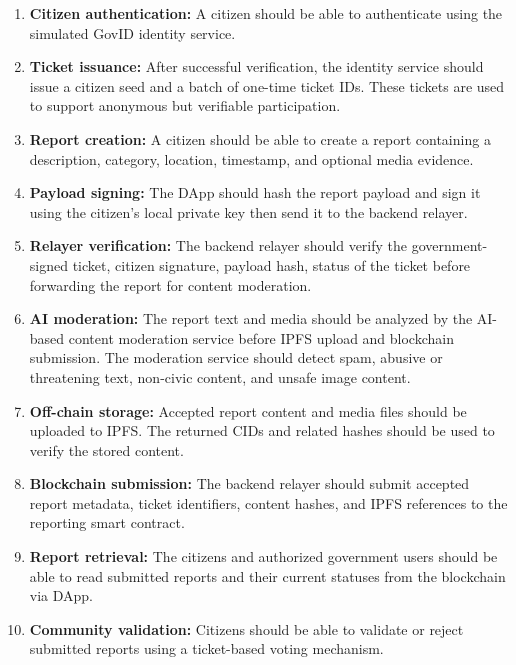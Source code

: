 \begin{enumerate}
    \item \textbf{Citizen authentication:}
    A citizen should be able to authenticate using the simulated GovID identity service.

    \item \textbf{Ticket issuance:}
    After successful verification, the identity service should issue a citizen seed and a 
    batch of one-time ticket IDs. These tickets are used to support anonymous but 
    verifiable participation.

    \item \textbf{Report creation:}
    A citizen should be able to create a report containing a description, category, 
    location, timestamp, and optional media evidence.

    \item \textbf{Payload signing:}
    The DApp should hash the report payload and sign it using the 
    citizen's local private key then send it to the backend relayer.

    \item \textbf{Relayer verification:}
    The backend relayer should verify the government-signed ticket, citizen signature, 
    payload hash, status of the ticket before forwarding the report for content moderation.

    \item \textbf{AI moderation:}
    The report text and media should be analyzed by the AI-based content moderation service before IPFS upload and blockchain submission. The moderation service should detect spam, abusive or threatening text, non-civic content, and unsafe image content.

    \item \textbf{Off-chain storage:}
    Accepted report content and media files should be uploaded to IPFS. The returned 
    CIDs and related hashes should be used to verify the stored content.

    \item \textbf{Blockchain submission:}
    The backend relayer should submit accepted report metadata, ticket identifiers, 
    content hashes, and IPFS references to the reporting smart contract.

    \item \textbf{Report retrieval:} The citizens and authorized government users should be able to  read submitted reports and their current statuses from the blockchain via DApp.
    
    \item \textbf{Community validation:}
    Citizens should be able to validate or reject submitted reports using a 
    ticket-based voting mechanism.


\end{enumerate}
